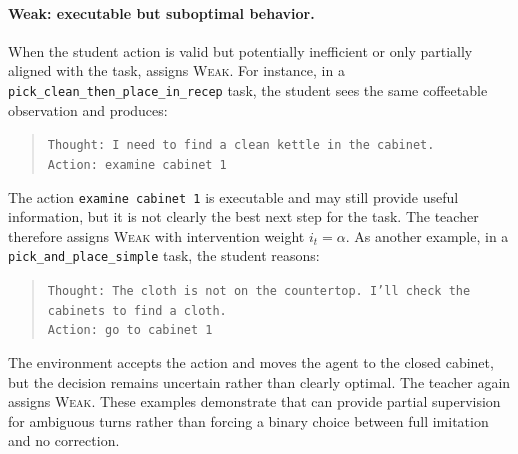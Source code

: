 \paragraph{Weak: executable but suboptimal behavior.}
When the student action is valid but potentially inefficient or only partially aligned with the task, \ours{} assigns \textsc{Weak}.
%
For instance, in a \texttt{pick\_clean\_then\_place\_in\_recep} task, the student sees the same coffeetable observation and produces:
%
\begin{quote}
\small
\texttt{Thought: I need to find a clean kettle in the cabinet.}\\
\texttt{Action: examine cabinet 1}
\end{quote}
%
The action \texttt{examine cabinet 1} is executable and may still provide useful information, but it is not clearly the best next step for the task.
%
The teacher therefore assigns \textsc{Weak} with intervention weight $i_t=\alpha$.
%
As another example, in a \texttt{pick\_and\_place\_simple} task, the student reasons:
%
\begin{quote}
\small
\texttt{Thought: The cloth is not on the countertop. I'll check the cabinets to find a cloth.}\\
\texttt{Action: go to cabinet 1}
\end{quote}
%
The environment accepts the action and moves the agent to the closed cabinet, but the decision remains uncertain rather than clearly optimal.
%
The teacher again assigns \textsc{Weak}.
%
These examples demonstrate that \ours{} can provide partial supervision for ambiguous turns rather than forcing a binary choice between full imitation and no correction.


